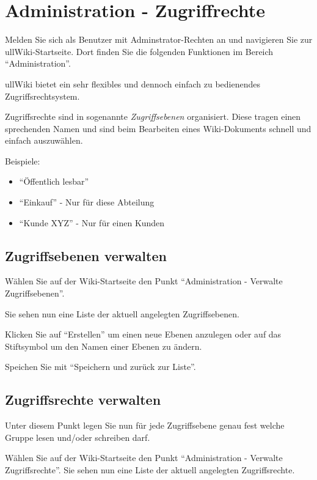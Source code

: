 \documentclass[article, a4paper, oneside, 11pt]{memoir}
\begin{document}


\chapter{Administration - Zugriffrechte}
\label{sec:admin}

Melden Sie sich als Benutzer mit Adminstrator-Rechten an und navigieren Sie zur ullWiki-Startseite. Dort finden Sie die folgenden Funktionen im Bereich "`Administration"'.

ullWiki bietet ein sehr flexibles und dennoch einfach zu bedienendes Zugriffsrechtsystem.

Zugriffsrechte sind in sogenannte \emph{Zugriffsebenen} organisiert. Diese tragen einen sprechenden Namen und sind beim Bearbeiten eines Wiki-Dokuments schnell und einfach auszuwählen.

Beispiele: 

\begin{itemize}
\item "`Öffentlich lesbar"'
\item "`Einkauf"' - Nur für diese Abteilung
\item "`Kunde XYZ"' - Nur für einen Kunden 
\end{itemize}


\section{Zugriffsebenen verwalten}
Wählen Sie auf der Wiki-Startseite den Punkt "`Administration - Verwalte Zugriffsebenen"'.

Sie sehen nun eine Liste der aktuell angelegten Zugriffsebenen.

Klicken Sie auf "`Erstellen"' um einen neue Ebenen anzulegen oder auf das Stiftsymbol um den Namen einer Ebenen zu ändern.

Speichen Sie mit "`Speichern und zurück zur Liste"'.



\section{Zugriffsrechte verwalten}
Unter diesem Punkt legen Sie nun für jede Zugriffsebene genau fest welche Gruppe lesen und/oder schreiben darf.

Wählen Sie auf der Wiki-Startseite den Punkt "`Administration - Verwalte Zugriffsrechte"'.
Sie sehen nun eine Liste der aktuell angelegten Zugriffsrechte.
\end{document}
